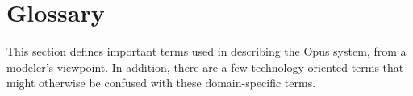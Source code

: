 
\chapter{Glossary}

This section defines important terms used in describing the Opus system,
from a modeler's viewpoint.  In addition, there are a few
technology-oriented terms that might otherwise be confused with these
domain-specific terms.

